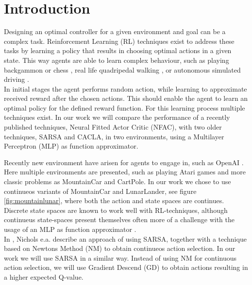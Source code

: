 
\section{Introduction}

Designing an optimal controller for a given environment and goal can be a complex task. Reinforcement Learning (RL) techniques exist to address these tasks by learning a policy that results in choosing optimal actions in a given state. This way agents are able to learn complex behaviour, such as playing backgammon \cite{tesauro2002programming} or chess \cite{baxter1999knightcap},
real life quadripedal walking \cite{kohl2004policy}, or autonomous simulated driving \cite{}. \\  %


In initial stages the agent performs random action, while learning to approximate received reward after the chosen actions. This should enable the agent to learn an optimal policy for the defined reward function. For this learning process multiple techniques exist. In our work we will compare the performance of a recently published techniques, Neural Fitted Actor Critic (NFAC), with two older techniques, SARSA and CACLA, in two environments, using a Multilayer Perceptron (MLP) as function approximator.

Recently new environment have arisen for agents to engage in, such as OpenAI \cite{openaigym}. Here multiple environments are presented, such as playing Atari games and more classic problems as MountainCar and CartPole. In our work we chose to use continueos variants of MountainCar and LunarLander, see figure \ref{fig:mountainlunar}, where both the action and state spaces are continues. 
Discrete state spaces are known to work well with RL-techniques, although continueus state-spaces present themselves often more of a challenge with the usage of an MLP as function approximator \cite{cetina2008multilayer}. \\

In \cite{nichols2015continuous}, Nichols e.a. describe an approach of using SARSA, together with a technique based on Newtons Method (NM) to obtain continueos action selection. 
In our work we will use SARSA in a similar way. Instead of using NM for continuous action selection, we will use Gradient Descend (GD) to obtain actions resulting in a higher expected Q-value.


